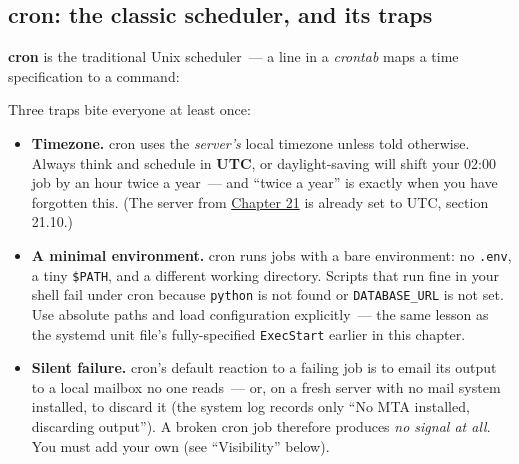 \subsection*{cron: the classic scheduler, and its traps}\label{25-process-management:cron-the-classic-scheduler-and-its-traps}

\textbf{cron} is the traditional Unix scheduler~--- a line in a \emph{crontab} maps a time specification to a command:

\begin{codebox}[short]

\begin{Shaded}
\begin{Highlighting}[]
\end{Highlighting}
\end{Shaded}

\end{codebox}

\noindent{}Three traps bite everyone at least once:

\begin{itemize}
\tightlist
\item
  \textbf{Timezone.} cron uses the \emph{server's} local timezone unless told otherwise. Always think and schedule in \textbf{UTC}, or daylight-saving will shift your 02:00 job by an hour twice a year~--- and ``twice a year'' is exactly when you have forgotten this. (The server from \hyperref[ch:21-system-setup]{Chapter 21} is already set to UTC, section 21.10.)
\item
  \textbf{A minimal environment.} cron runs jobs with a bare environment: no \texttt{.env}, a tiny \texttt{\$PATH}, and a different working directory. Scripts that run fine in your shell fail under cron because \texttt{python} is not found or \texttt{DATABASE\_URL} is not set. Use absolute paths and load configuration explicitly~--- the same lesson as the systemd unit file's fully-specified \texttt{ExecStart} earlier in this chapter.
\item
  \textbf{Silent failure.} cron's default reaction to a failing job is to email its output to a local mailbox no one reads~--- or, on a fresh server with no mail system installed, to discard it (the system log records only ``No MTA installed, discarding output''). A broken cron job therefore produces \emph{no signal at all}. You must add your own (see ``Visibility'' below).
\end{itemize}

